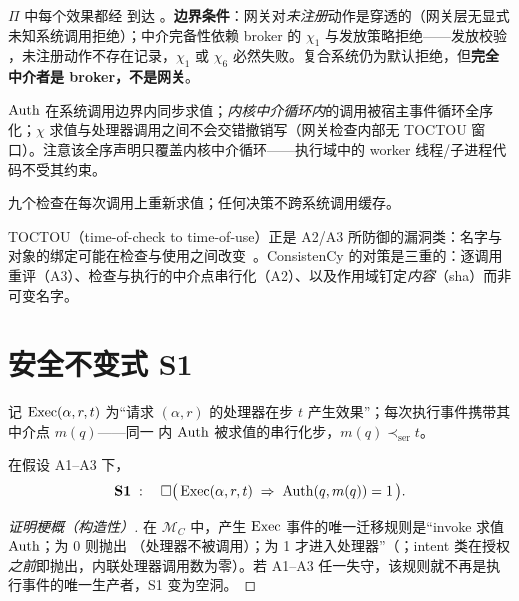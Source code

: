 \begin{assumptioninner}\label{ass:a1}
$\Pi$ 中每个效果都经  到达 。\textbf{边界条件}：网关对\emph{未注册}动作是穿透的（网关层无显式未知系统调用拒绝）；中介完备性依赖 broker 的 $\chi_1$ 与发放策略拒绝——发放校验 ，未注册动作不存在记录，$\chi_1$ 或 $\chi_6$ 必然失败。复合系统仍为默认拒绝，但\textbf{完全中介者是 broker，不是网关}。
\end{assumptioninner}

\begin{assumptioninner}[{同步串行化中介}]\label{ass:a2}
$\operatorname{Auth}$ 在系统调用边界内同步求值；\emph{内核中介循环内}的调用被宿主事件循环全序化；$\chi$ 求值与处理器调用之间不会交错撤销写（网关检查内部无 TOCTOU 窗口）。注意该全序声明只覆盖内核中介循环——执行域中的 worker 线程/子进程代码不受其约束。
\end{assumptioninner}

\begin{assumptioninner}[{无缓存}]\label{ass:a3}
九个检查在每次调用上重新求值；任何决策不跨系统调用缓存。
\end{assumptioninner}

TOCTOU（time-of-check to time-of-use）正是 A2/A3 所防御的漏洞类：名字与对象的绑定可能在检查与使用之间改变~\cite{bishop1996}。ConsistenCy 的对策是三重的：逐调用重评（A3）、检查与执行的中介点串行化（A2）、以及作用域钉定\emph{内容}（sha）而非可变名字。

\section{安全不变式 S1}

记 $\operatorname{Exec}(\alpha,r,t)$ 为“请求 $(\alpha,r)$ 的处理器在步 $t$ 产生效果”；每次执行事件携带其中介点 $m(q)$——同一  内 $\operatorname{Auth}$ 被求值的串行化步，$m(q)\prec_{\mathrm{ser}}t$。

\begin{proposition}\label{prop:s1}
在假设 A1--A3 下，
\begin{equation}
\mathbf{S1}\;:\quad \Box\bigl(\,\operatorname{Exec}(\alpha,r,t)\;\Rightarrow\;\operatorname{Auth}(q,m(q))=1\,\bigr).
\end{equation}
\end{proposition}
\begin{proof}[证明梗概（构造性）]
在 $\mathcal{M}_C$ 中，产生 $\operatorname{Exec}$ 事件的唯一迁移规则是“invoke 求值 $\operatorname{Auth}$；为 0 则抛出 （处理器不被调用）；为 1 才进入处理器”（；intent 类在授权\emph{之前}即抛出，内联处理器调用数为零）。若 A1--A3 任一失守，该规则就不再是执行事件的唯一生产者，S1 变为空洞。
\end{proof}

